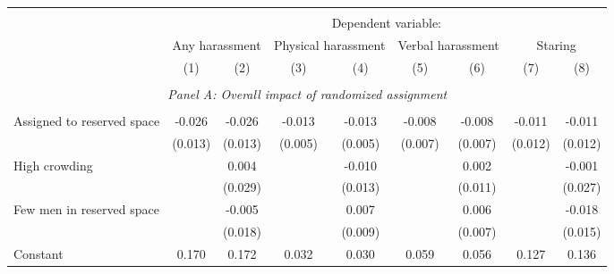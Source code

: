 \begin{tabular}{l*{8}{c}} \hline\hline \\[-1.8ex] & \multicolumn{8}{c}{Dependent variable: } \\ 
                    &\multicolumn{2}{c}{Any harassment}         &\multicolumn{2}{c}{Physical harassment}    &\multicolumn{2}{c}{Verbal harassment}      &\multicolumn{2}{c}{Staring}                \\\cmidrule(lr){2-3}\cmidrule(lr){4-5}\cmidrule(lr){6-7}\cmidrule(lr){8-9}
                    &\multicolumn{1}{c}{(1)}         &\multicolumn{1}{c}{(2)}         &\multicolumn{1}{c}{(3)}         &\multicolumn{1}{c}{(4)}         &\multicolumn{1}{c}{(5)}         &\multicolumn{1}{c}{(6)}         &\multicolumn{1}{c}{(7)}         &\multicolumn{1}{c}{(8)}         \\
 \hline \\[-1ex] \multicolumn{9}{c}{\textit{Panel A: Overall impact of randomized assignment}} \\\\[-1ex]
Assigned to reserved space&      -0.026\sym{**} &      -0.026\sym{**} &      -0.013\sym{***}&      -0.013\sym{***}&      -0.008         &      -0.008         &      -0.011         &      -0.011         \\
                    &     (0.013)         &     (0.013)         &     (0.005)         &     (0.005)         &     (0.007)         &     (0.007)         &     (0.012)         &     (0.012)         \\
[1em]
High crowding       &                     &       0.004         &                     &      -0.010         &                     &       0.002         &                     &      -0.001         \\
                    &                     &     (0.029)         &                     &     (0.013)         &                     &     (0.011)         &                     &     (0.027)         \\
[1em]
Few men in reserved space&                     &      -0.005         &                     &       0.007         &                     &       0.006         &                     &      -0.018         \\
                    &                     &     (0.018)         &                     &     (0.009)         &                     &     (0.007)         &                     &     (0.015)         \\
[1em]
Constant            &       0.170\sym{***}&       0.172\sym{***}&       0.032\sym{***}&       0.030\sym{***}&       0.059\sym{***}&       0.056\sym{***}&       0.127\sym{***}&       0.136\sym{***}\\

\end{tabular}

